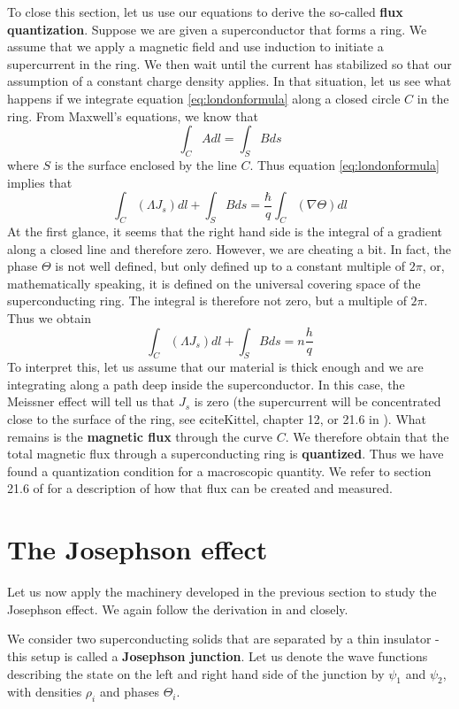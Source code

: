 \documentclass[a4paper, draft]{article}
\theoremstyle{own}
\theoremstyle{remark}
\begin{document}
To close this section, let us use our equations to derive the so-called {\bf flux quantization}. Suppose we are given a superconductor that forms a ring. We assume that we apply a magnetic field and use induction to initiate a supercurrent in the ring. We then wait until the current has stabilized so that our assumption of a constant charge density applies. In that situation, let us see what happens if we integrate equation \eqref{eq:londonformula} along a closed circle $C$ in the ring. From Maxwell's equations, we know that
$$
\int_C A dl = \int_S B ds
$$
where $S$ is the surface enclosed by the line $C$. Thus equation \eqref{eq:londonformula} implies that
$$
\int_C (\Lambda J_s) dl + \int_S B ds = \frac{\hbar}{q} \int_C (\nabla \Theta) dl
$$
At the first glance, it seems that the right hand side is the integral of a gradient along a closed line and therefore zero. However, we are cheating a bit. In fact, the phase $\Theta$ is not well defined, but only defined up to a constant multiple of $2 \pi$, or, mathematically speaking, it is defined on the universal covering space of the superconducting ring. The integral is therefore not zero, but a multiple of $2\pi$. Thus we obtain
$$
\int_C (\Lambda J_s) dl + \int_S B ds = n \frac{h}{q}   
$$
To interpret this, let us assume that our material is thick enough and we are integrating along a path deep inside the superconductor. In this case, the Meissner effect will tell us that $J_s$ is zero (the supercurrent will be concentrated close to the surface of the ring, see ¢cite{Kittel}, chapter 12, or 21.6 in \cite{FeynmanIII}). What remains is the {\bf magnetic flux} through the curve $C$. We therefore obtain that the total magnetic flux through a superconducting ring is {\bf quantized}. Thus we have found a quantization condition for a macroscopic quantity. We refer to section 21.6 of \cite{FeynmanIII} for a description of how that flux can be created and measured.


\section{The Josephson effect}

Let us now apply the machinery developed in the previous section to study the Josephson effect. We again follow the derivation in \cite{Kittel} and \cite{FeynmanIII} closely. 

We consider two superconducting solids that are separated by a thin insulator - this setup is called a {\bf Josephson junction}. Let us denote the wave functions describing the state on the left and right hand side of the junction by $\psi_1$ and $\psi_2$, with densities $\rho_i$ and phases $\Theta_i$. 
\end{document}
